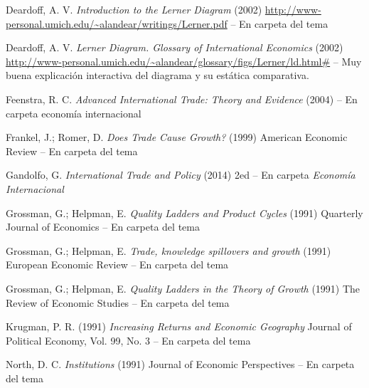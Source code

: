 \documentclass{nuevotema}
\begin{document}
Deardoff, A. V. \textit{Introduction to the Lerner Diagram} (2002) \url{http://www-personal.umich.edu/~alandear/writings/Lerner.pdf} -- En carpeta del tema

Deardoff, A. V. \textit{Lerner Diagram. Glossary of International Economics} (2002) \url{http://www-personal.umich.edu/~alandear/glossary/figs/Lerner/ld.html#} -- Muy buena explicación interactiva del diagrama y su estática comparativa.

Feenstra, R. C. \textit{Advanced International Trade: Theory and Evidence} (2004) -- En carpeta economía internacional

Frankel, J.; Romer, D. \textit{Does Trade Cause Growth?} (1999) American Economic Review -- En carpeta del tema

Gandolfo, G. \textit{International Trade and Policy} (2014) 2ed -- En carpeta \textit{Economía Internacional}

Grossman, G.; Helpman, E. \textit{Quality Ladders and Product Cycles} (1991) Quarterly Journal of Economics -- En carpeta del tema

Grossman, G.; Helpman, E. \textit{Trade, knowledge spillovers and growth} (1991) European Economic Review -- En carpeta del tema

Grossman, G.; Helpman, E. \textit{Quality Ladders in the Theory of Growth} (1991) The Review of Economic Studies -- En carpeta del tema

Krugman, P. R. (1991) \textit{Increasing Returns and Economic Geography} Journal of Political Economy, Vol. 99, No. 3 -- En carpeta del tema

North, D. C. \textit{Institutions} (1991) Journal of Economic Perspectives -- En carpeta del tema
\end{document}
